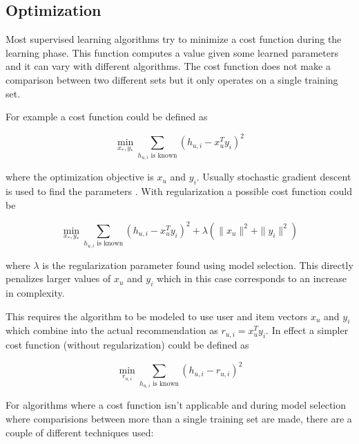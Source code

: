 
\subsection{Optimization}\label{sec:background:theory:opt}

Most supervised learning algorithms try to minimize a cost function during the learning phase. This function computes a value given some learned parameters and it can vary with different algorithms. The cost function does not make a comparison between two different sets but it only operates on a single training set.

For example a cost function could be defined as

\begin{equation}
    \min_{x_*, y_*} \sum_{h_{u,i} \text{ is known} } (h_{u, i} - x_{u}^T y_i)^2
\end{equation}

where the optimization objective is $x_u$ and $y_i$. Usually stochastic gradient descent is used to find the parameters \cite{hu2008collaborative}. With regularization a possible cost function could be

\begin{equation}
    \min_{x_*, y_*} \sum_{h_{u,i} \text{ is known} } (h_{u, i} - x_{u}^T y_i)^2 + \lambda(\|x_u\|^2 + \|y_i\|^2)
\end{equation}

where $\lambda$ is the regularization parameter found using model selection. This directly penalizes larger values of $x_u$ and $y_i$ which in this case corresponds to an increase in complexity.

This requires the algorithm to be modeled to use user and item vectors $x_u$ and $y_i$ which combine into the actual recommendation as $r_{u, i} = x_u^T y_i$. In effect a simpler cost function (without regularization) could be defined as

\begin{equation}
    \min_{r_{u, i}} \sum_{h_{u,i} \text{ is known} } (h_{u, i} - r_{u, i})^2
\end{equation}


For algorithms where a cost function isn't applicable and during model selection where comparisions between more than a single training set are made, there are a couple of different techniques used:


